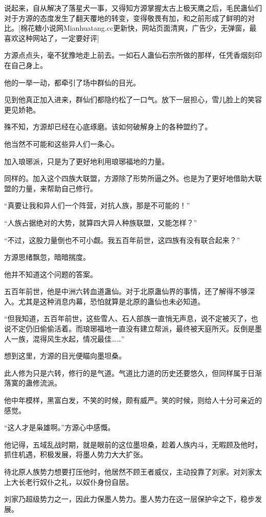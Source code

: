 \begin{this_body}
说起来，自从解决了落星犬一事，又得知方源掌握太古上极天鹰之后，毛民蛊仙们对于方源的态度发生了翻天覆地的转变，变得敬畏有加，和之前形成了鲜明的对比。[棉花糖小说网Mianhuatang.cc更新快，网站页面清爽，广告少，无弹窗，最喜欢这种网站了，一定要好评]

方源点点头，毫不犹豫地走上前去。一如石人蛊仙石宗所做的那样，任凭香烟刻印在自己身上。

他的一举一动，都牵引了场中群仙的目光。

见到他真正加入进来，群仙们都隐约松了一口气。放下一层担心，雪儿脸上的笑容更见娇艳。

殊不知，方源却已经在心底琢磨。该如何破解身上的各种盟约了。

他当然不可能和这些异人们一条心。

加入琅琊派，只是为了更好地利用琅琊福地的力量。

同样的。加入这个四族大联盟，方源除了形势所逼之外。也是为了更好地借助大联盟的力量，来帮助自己修行。

“真要让我和异人们一个阵营，对抗人族，那是不可能的！”

“人族占据绝对的大势，就算四大异人种族联盟，又能怎样？”

“不过，这股力量倒也不可小觑。我五百年前世，这四族有没有联合起来？”

方源思绪飘忽，暗暗揣度。

他并不知道这个问题的答案。

五百年前世，他是中洲六转血道蛊仙。对于北原蛊仙界的事情，还了解得不够深入。尤其是这种消息内幕，恐怕就算是北原的蛊仙也未必知道。

“但我知道，五百年前世，这些雪人、石人部族一直悄无声息，说不定被灭了，也说不定仍旧偷偷活着。而琅琊福地一直没有建立帮派，最终被天庭所灭。反倒是墨人一族，混得风生水起，情况最佳……”

想到这里，方源的目光便瞄向墨坦桑。

此人修为只是六转，修行的是气道。气道比力道的历史还要悠久，但同样属于日渐落寞的蛊修流派。

他中年模样，黑富白发，不笑的时候，颇有威严。笑的时候，则给人十分可亲近的感觉。

“这人才是枭雄啊。”方源心中感慨。

他记得，五域乱战时期，就是眼前的这位墨坦桑，趁着人族内斗，无暇顾及他时，抓住机遇，积极发展，将墨人势力大大扩张。

待北原人族势力想要打压他时，他居然不顾王者威仪，主动投靠了刘家。对刘家太上大长老行奴仆之礼，以奴仆身份自居。

刘家乃超级势力之一，因此力保墨人势力。墨人势力在这一层保护伞之下，稳步发展。


\end{this_body}
